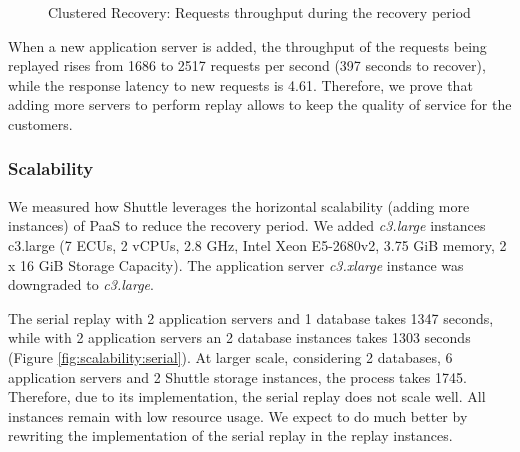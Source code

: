 \begin{figure}[!htb] 
    \centering
    \resizebox{0.7\linewidth}{!}{}
    \caption{Clustered Recovery: Requests throughput during the recovery period}
    \label{fig:restrain:clustered}
\end{figure}


When a new application server is added, the throughput of the requests being replayed rises from 1686 to 2517 requests per second (397 seconds to recover), while the response latency to new requests is 4.61\ms. Therefore, we prove that adding more servers to perform replay allows to keep the quality of service for the customers.





\subsubsection{Scalability}\label{sec:eval:recovery:scalability}
We measured how Shuttle leverages the horizontal scalability (adding more instances) of \ac{PaaS} to reduce the recovery period. We added \emph{c3.large} instances c3.large (7 \ac{ECU}s, 2 vCPUs, 2.8 GHz, Intel Xeon E5-2680v2, 3.75 GiB memory, 2 x 16 GiB Storage Capacity). The application server \emph{c3.xlarge} instance was downgraded to \emph{c3.large}. 

The serial replay with 2 application servers and 1 database takes 1347 seconds, while with 2 application servers an 2 database instances takes 1303 seconds (Figure \ref{fig:scalability:serial}). At larger scale, considering 2 databases, 6 application servers and 2 Shuttle storage instances, the process takes 1745\ms. Therefore, due to its implementation, the serial replay does not scale well. All instances remain with low resource usage. We expect to do much better by rewriting the implementation of the serial replay in the replay instances.

